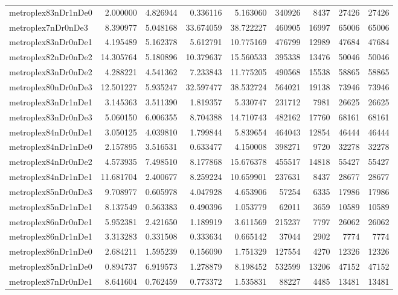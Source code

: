 \begin{longtable}{|l|r|r|r|r|r|r|r|r|}
metroplex83nDr1nDe0 & 2.000000 & 4.826944 & 0.336116 & 5.163060 & 340926 & 8437 & 27426 & 27426 \\
metroplex7nDr0nDe3 & 8.390977 & 5.048168 & 33.674059 & 38.722227 & 460905 & 16997 & 65006 & 65006 \\
metroplex83nDr0nDe1 & 4.195489 & 5.162378 & 5.612791 & 10.775169 & 476799 & 12989 & 47684 & 47684 \\
metroplex82nDr0nDe2 & 14.305764 & 5.180896 & 10.379637 & 15.560533 & 395338 & 13476 & 50046 & 50046 \\
metroplex83nDr0nDe2 & 4.288221 & 4.541362 & 7.233843 & 11.775205 & 490568 & 15538 & 58865 & 58865 \\
metroplex80nDr0nDe3 & 12.501227 & 5.935247 & 32.597477 & 38.532724 & 564021 & 19138 & 73946 & 73946 \\
metroplex83nDr1nDe1 & 3.145363 & 3.511390 & 1.819357 & 5.330747 & 231712 & 7981 & 26625 & 26625 \\
metroplex83nDr0nDe3 & 5.060150 & 6.006355 & 8.704388 & 14.710743 & 482162 & 17760 & 68161 & 68161 \\
metroplex84nDr0nDe1 & 3.050125 & 4.039810 & 1.799844 & 5.839654 & 464043 & 12854 & 46444 & 46444 \\
metroplex84nDr1nDe0 & 2.157895 & 3.516531 & 0.633477 & 4.150008 & 398271 & 9720 & 32278 & 32278 \\
metroplex84nDr0nDe2 & 4.573935 & 7.498510 & 8.177868 & 15.676378 & 455517 & 14818 & 55427 & 55427 \\
metroplex84nDr1nDe1 & 11.681704 & 2.400677 & 8.259224 & 10.659901 & 237631 & 8437 & 28677 & 28677 \\
metroplex85nDr0nDe3 & 9.708977 & 0.605978 & 4.047928 & 4.653906 & 57254 & 6335 & 17986 & 17986 \\
metroplex85nDr1nDe1 & 8.137549 & 0.563383 & 0.490396 & 1.053779 & 62011 & 3659 & 10589 & 10589 \\
metroplex86nDr0nDe1 & 5.952381 & 2.421650 & 1.189919 & 3.611569 & 215237 & 7797 & 26062 & 26062 \\
metroplex86nDr1nDe1 & 3.313283 & 0.331508 & 0.333634 & 0.665142 & 37044 & 2902 & 7774 & 7774 \\
metroplex86nDr1nDe0 & 2.684211 & 1.595239 & 0.156090 & 1.751329 & 127554 & 4270 & 12326 & 12326 \\
metroplex85nDr1nDe0 & 0.894737 & 6.919573 & 1.278879 & 8.198452 & 532599 & 13206 & 47152 & 47152 \\
metroplex87nDr0nDe1 & 8.641604 & 0.762459 & 0.773372 & 1.535831 & 88227 & 4485 & 13481 & 13481 \\

\end{longtable}
